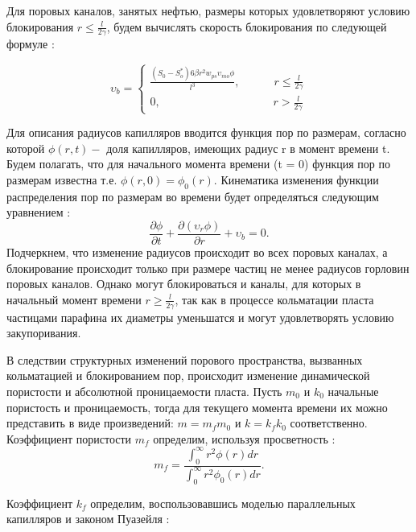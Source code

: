 \documentclass[12pt,twoside,a4paper]{uz_ku}
\begin{document}
	Для поровых каналов, занятых нефтью, размеры которых удовлетворяют условию блокирования $r \leq \frac{l}{2 \gamma}$, будем вычислять скорость блокирования по следующей формуле \cite{8}:
	
\begin{equation}\label{eq8}
\upsilon_b = \left\{\begin{matrix}
\frac{(S_0-S_{o}^{*}) 6 \beta r^2 w_{ps} \upsilon_{mo} \phi}{l^3}, \quad \qquad r \leq \frac{l}{2 \gamma}
 \\
 0, \qquad \qquad \qquad \qquad \qquad r > \frac{l}{2 \gamma}
\end{matrix}\right.
\end{equation}

	Для описания радиусов капилляров вводится функция пор по размерам, согласно которой $ \phi (r,t)-$ доля капилляров, имеющих радиус r в момент времени t. Будем полагать, что для начального момента времени (t = 0) функция пор по размерам известна т.е. $ \phi (r,0)= \phi_0 (r)$.
Кинематика изменения функции распределения пор по размерам во времени будет определяться следующим уравнением \cite{13}:
\begin{equation}\label{eq9}
\frac{\partial \phi}{\partial t} + \frac{\partial (\upsilon_r \phi)}{\partial r} + \upsilon_b = 0.
\end{equation}
Подчеркнем, что изменение радиусов происходит во всех поровых каналах, а блокирование происходит только при размере частиц не менее радиусов горловин поровых каналов. Однако могут блокироваться и каналы, для которых в начальный момент времени $r \geq \frac{l}{2 \gamma}$, так как в процессе кольматации пласта частицами парафина их диаметры уменьшатся и могут удовлетворять условию закупоривания.

	В следствии структурных изменений порового пространства, вызванных кольматацией и блокированием пор, происходит изменение динамической пористости и абсолютной проницаемости пласта. Пусть $m_0$ и $k_0$ начальные пористость и проницаемость, тогда для текущего момента времени их можно представить в виде произведений: $m=m_f m_0$ и $k=k_f k_0$ соответственно. Коэффициент пористости $m_f$ определим, используя просветность \cite{8}: 
\begin{equation}\label{eq10}
m_f = \frac
{ \int_{0}^{\infty} r^2 \phi (r) dr}
{ \int_{0}^{\infty} r^2 \phi_0 (r) dr}.
\end{equation}

	Коэффициент $k_f$ определим, воспользовавшись моделью параллельных капилляров и законом Пуазейля \cite{8}:
\end{document}
